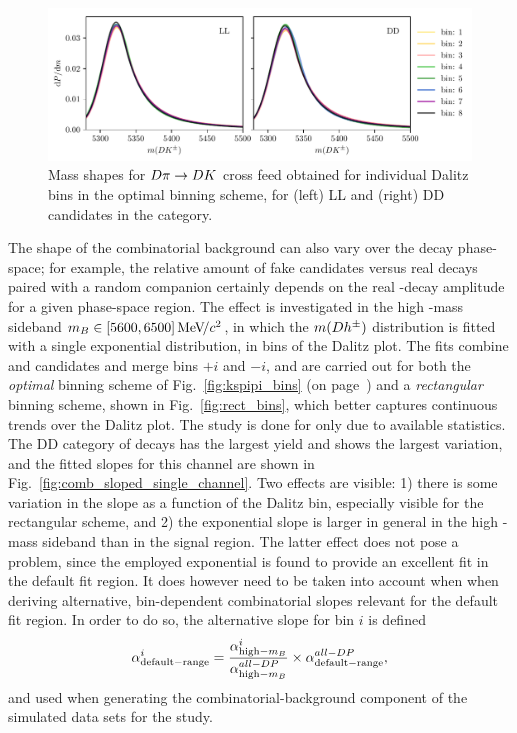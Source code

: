 \begin{figure}[tp]
    \centering
    \includegraphics[width=0.85\columnwidth]{figures/analysis/systematics/misID_bin_by_bin.pdf}
    \caption{Mass shapes for ${D}\pi \rightarrow{\ensuremath{D}}{\ensuremath{K}}$ cross feed obtained for individual Dalitz bins in the optimal binning scheme, for (left) LL and (right) DD candidates in the \DtoKspipi category.}
    \label{fig:misID_bin_by_bin}
\end{figure}

The shape of the combinatorial background can also vary over the \D decay phase-space; for example,  the relative amount of fake \D candidates versus real \D decays paired with a random companion certainly depends on the real \D-decay amplitude for a given phase-space region. The effect is investigated in the high \B-mass sideband $m_{B}\in[5600, 6500]\text{\,Me\kern -0.1em V\!/}c^2$, in which the $m({D} h^\pm)$ distribution is fitted with a single exponential distribution, in bins of the Dalitz plot. The fits combine \Bp and \Bm candidates and merge bins $+i$ and $-i$, and are carried out for both the \emph{optimal} binning scheme of Fig.~\ref{fig:kspipi_bins} (on page~\pageref{fig:kspipi_bins}) and a \emph{rectangular} binning scheme, shown in Fig.~\ref{fig:rect_bins}, which better captures continuous trends over the Dalitz plot. The study is done for \DtoKspipi only due to available statistics. The DD category of \BtoDpi decays has the largest yield and shows the largest variation, and the fitted slopes for this channel are shown in Fig.~\ref{fig:comb_sloped_single_channel}. Two effects are visible: 1) there is some variation in the slope as a function of the Dalitz bin, especially visible for the rectangular scheme, and 2) the exponential slope is larger in general in the high \B-mass sideband than in the signal region. The latter effect does not pose a problem, since the employed exponential is found to provide an excellent fit in the default fit region. It does however need to be taken into account when when deriving alternative, bin-dependent combinatorial slopes relevant for the default fit region. In order to do so, the alternative slope for bin $i$ is defined
\begin{align}
    \alpha^i_\mathrm{default-range} = \frac{\alpha^i_{\mathrm{high-}m_{B}}}{\alpha^{all-DP}_{\mathrm{high-}m_{B}}}\times \alpha^{all-DP}_\mathrm{default-range},
\end{align}
and used when generating the combinatorial-background component of the simulated data sets for the study.


